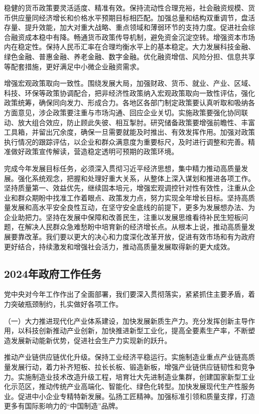 \documentclass[10pt, UTF8]{ctexbook} %
\begin{document}
稳健的货币政策要灵活适度、精准有效。保持流动性合理充裕，社会融资规模、货币供应量同经济增长和价格水平预期目标相匹配。加强总量和结构双重调节，盘活存量、提升效能，加大对重大战略、重点领域和薄弱环节的支持力度。促进社会综合融资成本稳中有降。畅通货币政策传导机制，避免资金沉淀空转。增强资本市场内在稳定性。保持人民币汇率在合理均衡水平上的基本稳定。大力发展科技金融、绿色金融、普惠金融、养老金融、数字金融。优化融资增信、风险分担、信息共享等配套措施，更好满足中小微企业融资需求。

增强宏观政策取向一致性。围绕发展大局，加强财政、货币、就业、产业、区域、科技、环保等政策协调配合，把非经济性政策纳入宏观政策取向一致性评估，强化政策统筹，确保同向发力、形成合力。各地区各部门制定政策要认真听取和吸纳各方面意见，涉企政策要注重与市场沟通、回应企业关切。实施政策要强化协同联动、放大组合效应，防止顾此失彼、相互掣肘。研究储备政策要增强前瞻性、丰富工具箱，并留出冗余度，确保一旦需要就能及时推出、有效发挥作用。加强对政策执行情况的跟踪评估，以企业和群众满意度为重要标尺，及时进行调整和完善。精准做好政策宣传解读，营造稳定透明可预期的政策环境。

完成今年发展目标任务，必须深入贯彻习近平经济思想，集中精力推动高质量发展。强化系统观念，把握和处理好重大关系，从整体上深入谋划和推进各项工作。坚持质量第一、效益优先，继续固本培元，增强宏观调控针对性有效性，注重从企业和群众期盼中找准工作着眼点、政策发力点，努力实现全年增长目标。坚持高质量发展和高水平安全良性互动，在坚守安全底线的前提下，更多为发展想办法、为企业助把力。坚持在发展中保障和改善民生，注重以发展思维看待补民生短板问题，在解决人民群众急难愁盼中培育新的经济增长点。从根本上说，推动高质量发展要靠改革。我们要以更大的决心和力度深化改革开放，促进有效市场和有为政府更好结合，持续激发和增强社会活力，推动高质量发展取得新的更大成效。

\subsection{2024年政府工作任务}

党中央对今年工作作出了全面部署，我们要深入贯彻落实，紧紧抓住主要矛盾，着力突破瓶颈制约，扎实做好各项工作。

（一）大力推进现代化产业体系建设，加快发展新质生产力。充分发挥创新主导作用，以科技创新推动产业创新，加快推进新型工业化，提高全要素生产率，不断塑造发展新动能新优势，促进社会生产力实现新的跃升。

推动产业链供应链优化升级。保持工业经济平稳运行。实施制造业重点产业链高质量发展行动，着力补齐短板、拉长长板、锻造新板，增强产业链供应链韧性和竞争力。实施制造业技术改造升级工程，培育壮大先进制造业集群，创建国家新型工业化示范区，推动传统产业高端化、智能化、绿色化转型。加快发展现代生产性服务业。促进中小企业专精特新发展。弘扬工匠精神。加强标准引领和质量支撑，打造更多有国际影响力的“中国制造”品牌。
\end{document}

